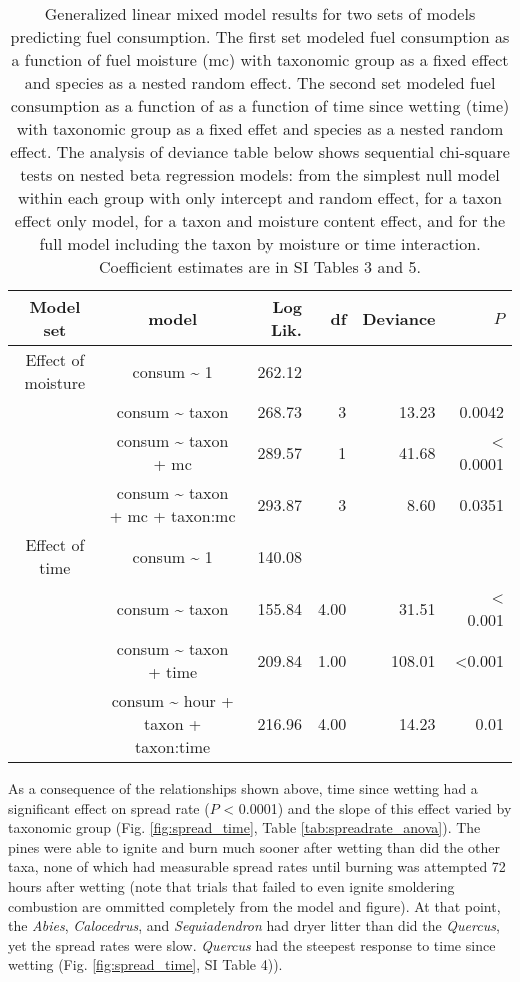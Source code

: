 \documentclass[fire,article,submit,moreauthors,pdftex]{Definitions/mdpi}
\begin{document}
\begin{table}[H]
  \caption{Generalized linear mixed model results for two sets of models predicting fuel consumption. The first set modeled fuel consumption as a function of fuel moisture (mc) with taxonomic group as a fixed effect and species as a nested random effect. The second set modeled fuel consumption as a function of as a function of time since wetting (time) with taxonomic group as a fixed effet and species as a nested random effect. The analysis of deviance table below shows sequential chi-square tests on nested beta regression models: from the simplest null model within each group with only intercept and random effect, for a taxon effect only model, for a taxon and moisture content effect, and for the full model including the taxon by moisture or time interaction. Coefficient estimates are in SI Tables 3 and 5.}
  \label{tab:consume_anova}
  \centering

  \begin{tabular}{ccrrrr}
\toprule
Model set & model & Log Lik. & df & Deviance & $P$ \\ 
\midrule
  Effect of moisture &  consum \~{} 1 & 262.12 &  &  &  \\ 
   & consum \~{} taxon & 268.73 & 3 & 13.23 & 0.0042 \\ 
   & consum \~{} taxon + mc & 289.57 & 1 & 41.68 & < 0.0001 \\ 
   & consum \~{} taxon + mc + taxon:mc & 293.87 & 3 & 8.60 & 0.0351 \\ 
\midrule
Effect of time &  consum \~{} 1 & 140.08 &  &  &  \\ 
 &  consum \~{} taxon & 155.84 & 4.00 & 31.51 & < 0.001 \\ 
 & consum \~{} taxon + time & 209.84 & 1.00 & 108.01 & <0.001 \\ 
 & consum \~{} hour + taxon + taxon:time & 216.96 & 4.00 & 14.23 & 0.01 \\ 
    \bottomrule
    \end{tabular}
\end{table}


As a consequence of the relationships shown above, time since wetting had a significant effect on spread rate ($P$ < 0.0001) and the slope of this effect varied by taxonomic group (Fig. \ref{fig:spread_time}, Table \ref{tab:spreadrate_anova}). The pines were able to ignite and burn much sooner after wetting than did the other taxa, none of which had measurable spread rates until burning was attempted 72 hours after wetting (note that trials that failed to even ignite smoldering combustion are ommitted completely from the model and figure). At that point, the \emph{Abies}, \emph{Calocedrus}, and \emph{Sequiadendron} had dryer litter than did the \emph{Quercus}, yet the spread rates were slow. \emph{Quercus} had the steepest response to time since wetting (Fig. \ref{fig:spread_time}, SI Table 4)).
\end{document}
